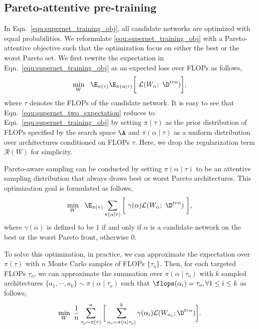 \documentclass[final]{cvpr}
\theoremstyle{definition}
\begin{document}
\subsection{Pareto-attentive pre-training}
\label{sec:pareto_aware_sampling}

In Eqn.~\eqref{equ:supernet_training_obj}, all candidate networks are optimized with equal probabilities.
We reformulate \eqref{equ:supernet_training_obj} with a Pareto-attentive objective
such that the optimization focus on either the best or the worst Pareto set. 
We first rewrite the expectation in Eqn.~\eqref{equ:supernet_training_obj} as 
an expected loss over FLOPs as follows, 
\begin{align}
\min_{W} ~~\E_{\pi(\tau)}\E_{ \pi(\alpha\mid\tau)} \bigg[~\L(W_\alpha; ~\D^{trn}) \bigg], \label{equ:supernet_two_expectation}
\end{align}
where $\tau$ denotes the FLOPs of the candidate network.
It is easy to see that Eqn.~\eqref{equ:supernet_two_expectation} reduces to Eqn.~\eqref{equ:supernet_training_obj} by setting
$\pi(\tau)$ as the prior distribution of FLOPs specified by the search space $\A$ and  $\pi(\alpha\mid \tau)$ as a uniform distribution over architectures conditioned on FLOPs $\tau$. 
Here, we drop the regularization term $\mathcal{R}(W)$ for simplicity. 
 
Pareto-aware sampling can be conducted by setting 
$\pi(\alpha\mid \tau)$ to be an attentive sampling distribution
that always draws {best} or {worst} Pareto architectures. 
This optimization goal is formulated as follows,
\begin{align}
\min_W ~~ \E_{\pi(\tau)} \sum_{\pi(\alpha|\tau)}\bigg[~ \gamma(\alpha) \L(W_\alpha; ~\D^{trn}) ~\bigg] ,
\end{align}
where $\gamma(\alpha)$ is defined to be $1$ if and only if $\alpha$ is a candidate network on the best or the worst {Pareto} front, otherwise 0. 

To solve this optimization, 
in practice, we can approximate the expectation over $\pi(\tau)$
with $n$ Monte Carlo samples of FLOPs $\{\tau_o\}$.  
Then,  for each targeted FLOPs $\tau_o$, 
we can approximate the summation over $\pi(\alpha\mid \tau_o)$
with $k$ sampled architectures $\{a_1, \cdots, a_k\} \sim \pi(\alpha\mid \tau_o)$ such that $\flops(\alpha_i) =\tau_o, \forall 1 \leq i \leq k$ as follows,
\begin{align}
    \min_W ~ \frac{1}{n} \sum_{\tau_o \sim \pi(\tau)}^n \bigg[ \sum_{\alpha_i \sim \pi(\alpha\mid \tau_o)}^k \gamma(\alpha_i) \L(W_{\alpha_i}; \D^{trn}) \bigg].  \label{equ:nas_algorithm}
\end{align}
\end{document}
